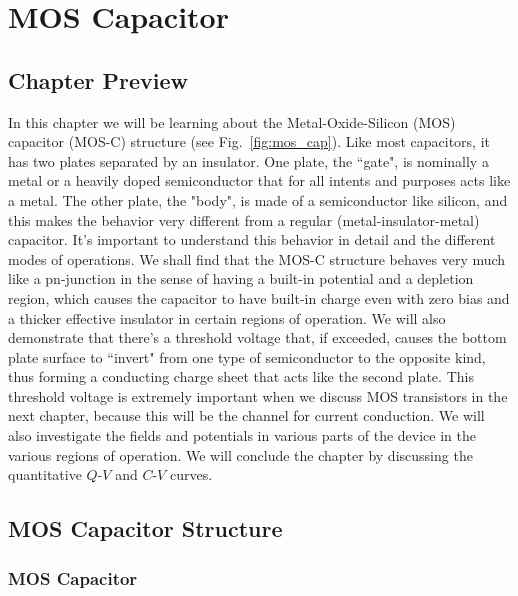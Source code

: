 
\chapter{MOS Capacitor}



\graphicspath{{./figs_MOS_C/}}




\section{Chapter Preview}

In this chapter we will be learning about the Metal-Oxide-Silicon (MOS) capacitor (MOS-C) structure (see Fig.~\ref{fig:mos_cap}).  Like most capacitors, it has two plates separated by an insulator.  One plate, the ``gate",  is nominally a metal or a heavily doped semiconductor that for all intents and purposes acts like a metal.  The other plate, the "body",  is made of a semiconductor like silicon, and this makes the behavior very different from a regular (metal-insulator-metal) capacitor. It's important to understand this behavior in detail and the different modes of operations.   We shall find that the MOS-C structure behaves very much like a pn-junction in the sense of having a built-in potential and a depletion region, which causes the capacitor to have built-in charge even with zero bias and a thicker effective insulator in certain regions of operation.  We will also demonstrate that there's a threshold voltage that, if exceeded, causes the bottom plate surface to ``invert" from one type of semiconductor to the opposite kind, thus forming a conducting charge sheet that acts like the second plate.  This threshold voltage is extremely important when we discuss MOS transistors in the next chapter, because this will be the channel for current conduction.  We will also investigate the fields and potentials in various parts of the device in the various regions of operation.  We will conclude the chapter by discussing the quantitative  $Q$-$V$ and $C$-$V$ curves.



\section{MOS Capacitor Structure}



\subsection{MOS Capacitor}

